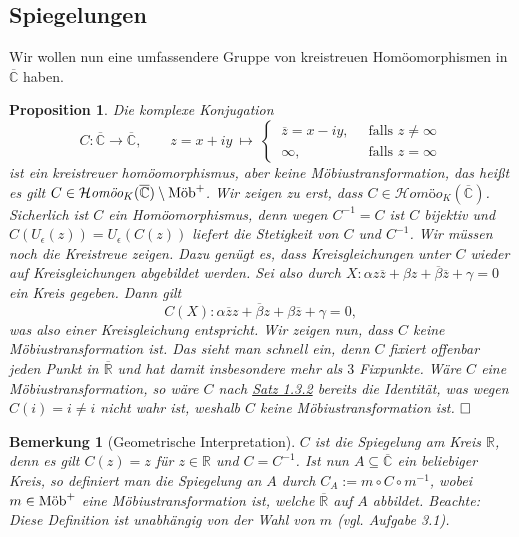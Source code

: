 \documentclass[11pt]{book}
\numberwithin{dummy}{section}
\newtheorem{proposition}[theorem]{Proposition}
\newtheorem{remark}[theorem]{Bemerkung}
\theoremstyle{nonumberbreak}
\newenvironment{pr}[1][]{\ifthenelse{\equal{#1}{}}{\proof}{\proof[#1]}\rm}{\endproof}
\newcommand{\CC}{\overline{\mathbb{C}}}
\newcommand{\la}{\longrightarrow}
\newcommand{\homoekcc}{\mathcal{H}\textit{omöo}_K(\CC)}
\newcommand{\mob}{\textup{Möb}^+}
\begin{document}
\begin{spacing}{1.4}
\section{Spiegelungen} %





Wir wollen nun eine umfassendere Gruppe von kreistreuen Homöomorphismen in $\CC$ haben.


\hypertarget{propeinssechseins}{}
\begin{proposition}    %
Die komplexe Konjugation
$$C: \CC \la \CC, \qquad z=x+iy\ \mapsto \ \begin{cases} \ \overline{z} = x-iy, & \ \textrm{ falls } z \neq \infty \\ \ \infty, & \ \textrm{ falls } z= \infty \end{cases}$$
ist ein kreistreuer homöomorphismus, aber keine Möbiustransformation, das heißt es gilt $C \in \homoekcc \setminus \mob$. 
\begin{pr}
Wir zeigen zu erst, dass $C \in \homoekcc$. Sicherlich ist $C$ ein Homöomorphismus, denn wegen $C^{-1}=C$ ist $C$ bijektiv und $C(U_{\epsilon}(z)) = U_{\epsilon}(C(z))$ liefert die Stetigkeit von $C$ und $C^{-1}$. Wir müssen noch die Kreistreue zeigen. Dazu genügt es, dass Kreisgleichungen unter $C$ wieder auf Kreisgleichungen abgebildet werden. Sei also durch $X:\alpha z \overline{z} + \beta z + \overline{\beta} \overline{z} + \gamma =0$ ein Kreis gegeben. Dann gilt 
$$C(X): \alpha \overline{z} z + \overline{\beta} z + \beta \overline{z} + \gamma=0,$$
was also einer Kreisgleichung entspricht. Wir zeigen nun, dass $C$ keine Möbiustransformation ist. Das sieht man schnell ein, denn $C$ fixiert offenbar jeden Punkt in $\overline{\mathbb{R}}$ und hat damit insbesondere mehr als $3$ Fixpunkte. Wäre $C$ eine Möbiustransformation, so wäre $C$ nach \hyperlink{satzeinsdreizwei}{Satz 1.3.2} bereits die Identität, was wegen $C(i)=i \neq i$ nicht wahr ist, weshalb $C$ keine Möbiustransformation ist. $\hfill \Box$

\end{pr}
\end{proposition}

\begin{remark}[Geometrische Interpretation]
$C$ ist die Spiegelung am Kreis $\mathbb{R}$, denn es gilt $C(z)=z$ für $z \in \mathbb{R}$ und $C=C^{-1}$. Ist nun $A \subseteq \CC$ ein beliebiger Kreis, so definiert man die Spiegelung an $A$ durch $C_A := m \circ C \circ m^{-1}$, wobei $m \in \mob$ eine Möbiustransformation ist, welche $\overline{\mathbb{R}}$ auf $A$ abbildet. Beachte: Diese Definition ist unabhängig von der Wahl von $m$ (vgl. Aufgabe 3.1).


\end{remark}
\end{spacing}
\end{document}
